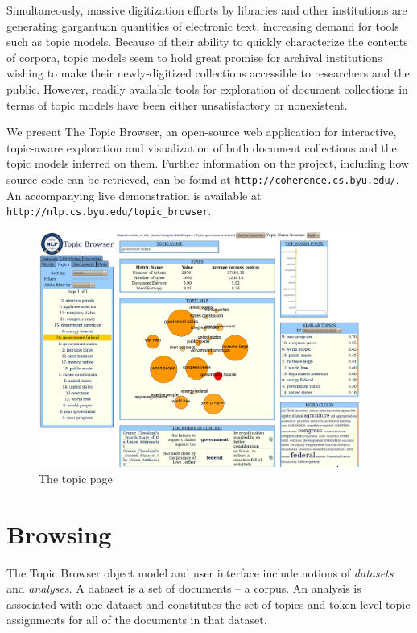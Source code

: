 \documentclass[11pt]{article}
\begin{document}
Simultaneously, massive digitization efforts by libraries and other institutions
are generating gargantuan quantities of electronic text, increasing demand for tools such as
topic models. Because of their ability to quickly characterize the contents of
corpora, topic models seem to hold great promise for archival
institutions wishing to make their newly-digitized collections accessible to
researchers and the public. However, readily available tools for exploration of 
document collections in terms of topic models have been either unsatisfactory
or nonexistent.

We present The Topic Browser, an open-source web application for interactive,
topic-aware exploration and visualization of both document collections and the
topic models inferred on them. Further information on the project, including
how source code can be retrieved, can be found
at \texttt{http://coherence.cs.byu.edu/}. An accompanying live demonstration is available %
at \texttt{http://nlp.cs.byu.edu/topic\_browser}.%

\begin{figure}[ht]
 \centering
 \includegraphics[width=400px,keepaspectratio=true]{./topic_page_take2.png}
 \caption{The topic page}
 \label{fig:topic_page}
\end{figure}

\section{Browsing}
The Topic Browser object model and user interface include notions of \textit{datasets} and \textit{analyses}.
A dataset is a set of documents -- a corpus. An analysis is associated with one dataset and constitutes the set of topics and token-level topic assignments for
all of the documents in that dataset.
\end{document}
